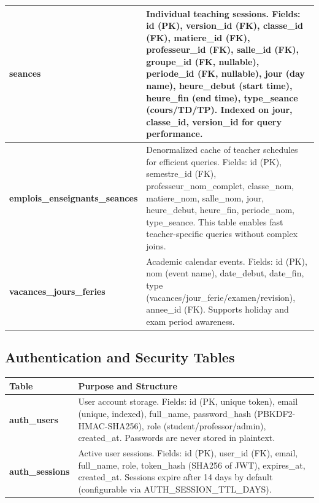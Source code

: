 \begin{center}
\begin{tabular}{|p{2.5cm}|p{10cm}|}
\textbf{seances} & 
Individual teaching sessions. Fields: id (PK), version\_id (FK), classe\_id (FK), matiere\_id (FK), professeur\_id (FK), salle\_id (FK), groupe\_id (FK, nullable), periode\_id (FK, nullable), jour (day name), heure\_debut (start time), heure\_fin (end time), type\_seance (cours/TD/TP). Indexed on jour, classe\_id, version\_id for query performance. \\
\hline

\textbf{emplois\_enseignants\_seances} & 
Denormalized cache of teacher schedules for efficient queries. Fields: id (PK), semestre\_id (FK), professeur\_nom\_complet, classe\_nom, matiere\_nom, salle\_nom, jour, heure\_debut, heure\_fin, periode\_nom, type\_seance. This table enables fast teacher-specific queries without complex joins. \\
\hline

\textbf{vacances\_jours\_feries} & 
Academic calendar events. Fields: id (PK), nom (event name), date\_debut, date\_fin, type (vacances/jour\_ferie/examen/revision), annee\_id (FK). Supports holiday and exam period awareness. \\
\hline

\end{tabular}
\end{center}

\subsection{Authentication and Security Tables}

\begin{center}
\begin{tabular}{|p{2.5cm}|p{10cm}|}
\hline
\textbf{Table} & \textbf{Purpose and Structure} \\
\hline

\textbf{auth\_users} & 
User account storage. Fields: id (PK, unique token), email (unique, indexed), full\_name, password\_hash (PBKDF2-HMAC-SHA256), role (student/professor/admin), created\_at. Passwords are never stored in plaintext. \\
\hline

\textbf{auth\_sessions} & 
Active user sessions. Fields: id (PK), user\_id (FK), email, full\_name, role, token\_hash (SHA256 of JWT), expires\_at, created\_at. Sessions expire after 14 days by default (configurable via AUTH\_SESSION\_TTL\_DAYS). \\
\hline

\end{tabular}
\end{center}

